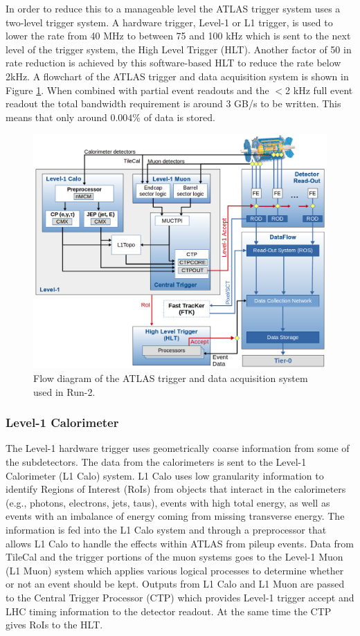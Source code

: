 In order to reduce this to a manageable level the ATLAS trigger system uses a two-level trigger system.  A hardware trigger, Level-1 or L1 trigger, is used to lower the rate from 40 MHz to between 75 and 100 kHz which is sent to the next level of the trigger system, the High Level Trigger (HLT).  Another factor of 50 in rate reduction is achieved by this software-based HLT to reduce the rate below 2kHz.  A flowchart of the ATLAS trigger and data acquisition system is shown in Figure \ref{fig:ATLAStdaq}.  When combined with partial event readouts and the $<$2 kHz full event readout the total bandwidth requirement is around 3 GB/s to be written.  This means that only around $0.004\%$ of data is stored.
\begin{figure}[!htb]
	\centering
	\includegraphics[width=.8\columnwidth]{../ThesisImages/LHCImages/ATLASTDAQR2.png}
	\caption[Flow diagram of the ATLAS trigger and data acquisition system used in Run-2.]{Flow diagram of the ATLAS trigger and data acquisition system used in Run-2\cite{ATLASTDAQ}.
	}
	\label{fig:ATLAStdaq}
\end{figure}

\subsubsection{Level-1 Calorimeter}
The Level-1 hardware trigger uses geometrically coarse information from some of the subdetectors.  The data from the calorimeters is sent to the Level-1 Calorimeter (L1 Calo) system.  L1 Calo uses low granularity information to identify Regions of Interest (RoIs) from objects that interact in the calorimeters (e.g., photons, electrons, jets, taus), events with high total energy, as well as events with an imbalance of energy coming from missing transverse energy.  The information is fed into the L1 Calo system and through a preprocessor that allows L1 Calo to handle the effects within ATLAS from pileup events.
Data from TileCal and the trigger portions of the muon systems goes to the Level-1 Muon (L1 Muon) system which applies various logical processes to determine whether or not an event should be kept.  
Outputs from L1 Calo and L1 Muon are passed to the Central Trigger Processor (CTP) which provides Level-1 trigger accept and LHC timing information to the detector readout.  At the same time the CTP gives RoIs to the HLT.


